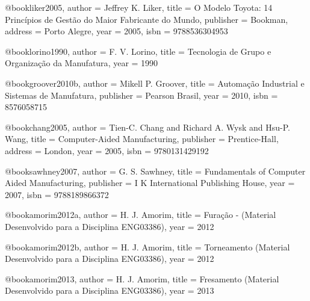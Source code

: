 @book{liker2005,
  author = {Jeffrey K. Liker},
  title = {O Modelo Toyota: 14 Princípios de Gestão do Maior Fabricante do Mundo},
  publisher = {Bookman},
  address = {Porto Alegre},
  year = {2005},
  isbn = {9788536304953}
}

@book{lorino1990,
  author = {F. V. Lorino},
  title = {Tecnologia de Grupo e Organização da Manufatura},
  year = {1990}
}

%

@book{groover2010b,
  author = {Mikell P. Groover},
  title = {Automação Industrial e Sistemas de Manufatura},
  publisher = {Pearson Brasil},
  year = {2010},
  isbn = {8576058715}
}

@book{chang2005,
  author = {Tien-C. Chang and Richard A. Wysk and Hsu-P. Wang},
  title = {Computer-Aided Manufacturing},
  publisher = {Prentice-Hall},
  address = {London},
  year = {2005},
  isbn = {9780131429192}
}

@book{sawhney2007,
  author = {G. S. Sawhney},
  title = {Fundamentals of Computer Aided Manufacturing},
  publisher = {I K International Publishing House},
  year = {2007},
  isbn = {9788189866372}
}

@book{amorim2012a,
  author = {H. J. Amorim},
  title = {Furação - (Material Desenvolvido para a Disciplina ENG03386)},
  year = {2012}
}

@book{amorim2012b,
  author = {H. J. Amorim},
  title = {Torneamento (Material Desenvolvido para a Disciplina ENG03386)},
  year = {2012}
}

@book{amorim2013,
  author = {H. J. Amorim},
  title = {Fresamento (Material Desenvolvido para a Disciplina ENG03386)},
  year = {2013}
}

